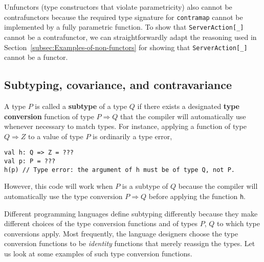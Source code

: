 Unfunctors (type constructors that violate parametricity)
also cannot be contrafunctors because the required type signature
for \lstinline!contramap! cannot be implemented by a fully parametric
function. To show that \lstinline!ServerAction[_]! cannot be a contrafunctor,
we can straightforwardly adapt the reasoning used in Section~\ref{subsec:Examples-of-non-functors}
for showing that \lstinline!ServerAction[_]! cannot be a functor.

\subsection{Subtyping, covariance, and contravariance}

A type $P$ is called a \textbf{subtype}
of a type $Q$ if there exists a designated
\textbf{type conversion} function of type $P\Rightarrow Q$ that the
compiler will automatically use whenever necessary to match types.
For instance, applying a function of type $Q\Rightarrow Z$ to a value
of type $P$ is ordinarily a type error,
\begin{lstlisting}
val h: Q => Z = ???
val p: P = ???
h(p) // Type error: the argument of h must be of type Q, not P.
\end{lstlisting}
However, this code will work when $P$ is a subtype of $Q$ because
the compiler will automatically use the type conversion $P\Rightarrow Q$
before applying the function \lstinline!h!.

Different programming languages define subtyping differently because
they make different choices of the type conversion functions and of
types $P$, $Q$ to which type conversions apply. Most frequently,
the language designers choose the type conversion functions to be
\emph{identity} functions that merely reassign the types. Let us look
at some examples of such type conversion functions. 

